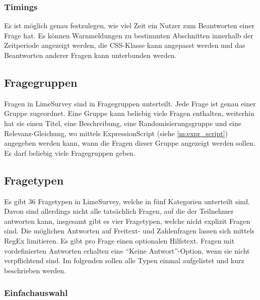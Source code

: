 \subsubsection{Timings}

Es ist möglich genau festzulegen, wie viel Zeit ein Nutzer zum Beantworten einer Frage hat.
Es können Warnmeldungen zu bestimmten Abschnitten innerhalb der Zeitperiode angezeigt werden, die CSS-Klasse kann angepasst werden und das Beantworten anderer Fragen kann unterbunden werden.

\subsection{Fragegruppen}


Fragen in LimeSurvey sind in Fragegruppen unterteilt. Jede Frage ist genau einer Gruppe zugeordnet.
Eine Gruppe kann beliebig viele Fragen enthalten, weiterhin hat sie einen Titel, eine Beschreibung, eine Randomisierungsgruppe und eine Relevanz-Gleichung, wo mittels ExpressionScript (siehe \cref{m:expr_script}) angegeben werden kann, wann die Fragen dieser Gruppe angezeigt werden sollen.
Es darf beliebig viele Fragegruppen geben.

\subsection{Fragetypen}


Es gibt 36 Fragetypen in LimeSurvey, welche in fünf Kategorien unterteilt sind.
Davon sind allerdings nicht alle tatsächlich Fragen, auf die der Teilnehmer antworten kann, insgesamt gibt es vier Fragetypen, welche nicht explizit Fragen sind.
Die möglichen Antworten auf Freitext- und Zahlenfragen lassen sich mittels RegEx limitieren.
Es gibt pro Frage einen optionalen Hilfstext.
Fragen mit vordefinierten Antworten erhalten eine \enquote{Keine Antwort}-Option, wenn sie nicht verpflichtend sind.
Im folgenden sollen alle Typen einmal aufgelistet und kurz beschrieben werden.


\subsubsection{Einfachauswahl}

